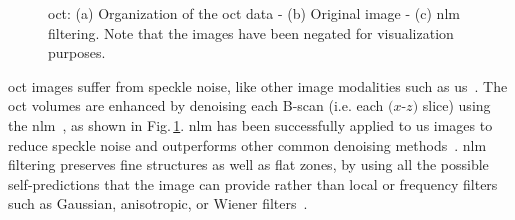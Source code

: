 \begin{figure}[t]
  \centering
  \hspace*{\fill}
   \hfill
   \hfill
  \hspace*{\fill}
  \caption{\ac{oct}: (a) Organization of the \ac{oct} data - (b) Original image - (c) \ac{nlm} filtering. Note that the images have been negated for visualization purposes.}
  \label{fig:denoise}
\end{figure}


\ac{oct} images suffer from speckle noise, like other image modalities such as \ac{us}~\cite{schmitt1999speckle}.
The \ac{oct} volumes are enhanced by denoising each B-scan (i.e. each $(x$-$z)$ slice) using the \ac{nlm}~\cite{buades2005non}, as shown in Fig.\,\ref{fig:denoise}.
\ac{nlm} has been successfully applied to \ac{us} images to reduce speckle noise and outperforms other common denoising methods~\cite{Coupe2009}.
\ac{nlm} filtering preserves fine structures as well as flat zones, by using all the possible self-predictions that the image can provide rather than local or frequency filters such as Gaussian, anisotropic, or Wiener filters~\cite{buades2005non}.

